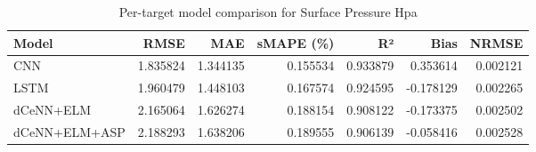 \begin{table}
\caption{Per-target model comparison for Surface Pressure Hpa}
\begin{tabular}{lrrrrrr}
\toprule
Model & RMSE & MAE & sMAPE (\%) & R² & Bias & NRMSE \\
\midrule
CNN & 1.835824 & 1.344135 & 0.155534 & 0.933879 & 0.353614 & 0.002121 \\
LSTM & 1.960479 & 1.448103 & 0.167574 & 0.924595 & -0.178129 & 0.002265 \\
dCeNN+ELM & 2.165064 & 1.626274 & 0.188154 & 0.908122 & -0.173375 & 0.002502 \\
dCeNN+ELM+ASP & 2.188293 & 1.638206 & 0.189555 & 0.906139 & -0.058416 & 0.002528 \\
\bottomrule
\end{tabular}
\end{table}

